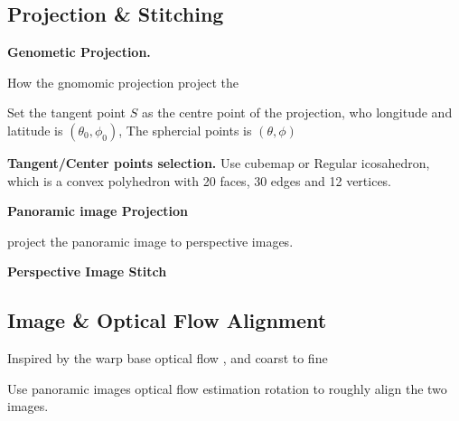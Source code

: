 \subsection{Projection \& Stitching}

\textbf{Genometic Projection.}

How the gnomomic projection project the 

Set the tangent point $S$ as the centre point of the projection, who longitude and latitude is $(\theta_0, \phi_0)$,
The sphercial points is $(\theta, \phi)$



\textbf{Tangent/Center points selection.}
Use cubemap or Regular icosahedron, which is a convex polyhedron with 20 faces, 30 edges and 12 vertices.

%


\textbf{Panoramic image Projection}

project the panoramic image to perspective images.


\textbf{Perspective Image Stitch}



\subsection{Image \& Optical Flow Alignment}

Inspired by the warp base optical flow \cite{?}, and coarst to fine 

Use panoramic images optical flow estimation rotation to roughly align the two images.

